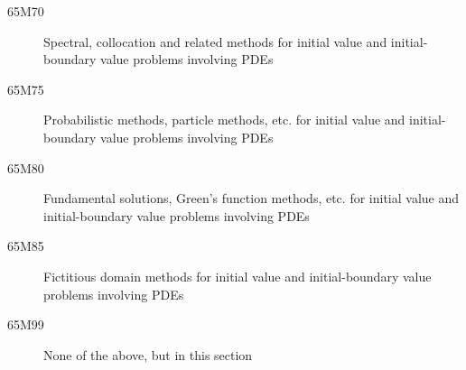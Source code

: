 \documentclass[letterpaper]{article}
\begin{document}
\begin{description}
\item [65M70]\label{65M70} Spectral, collocation and related methods for initial value and initial-boundary value problems involving PDEs
\item [65M75]\label{65M75} Probabilistic methods, particle methods, etc. for initial value and initial-boundary value problems involving PDEs
\item [65M80]\label{65M80} Fundamental solutions, Green's function methods, etc. for initial value and initial-boundary value problems involving PDEs
\item [65M85]\label{65M85} Fictitious domain methods for initial value and initial-boundary value problems involving PDEs
\item [65M99]\label{65M99} None of the above, but in this section
\end{description}
\end{document}
